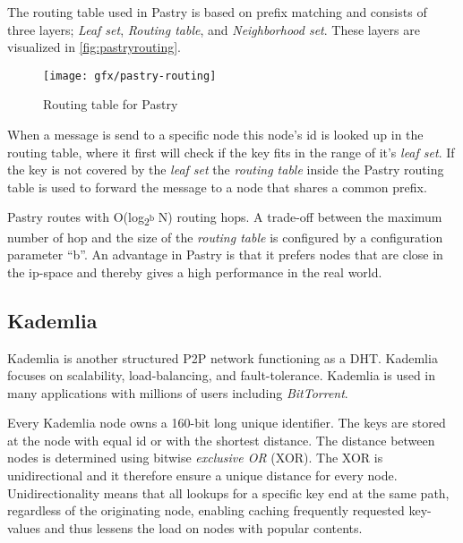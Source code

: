 The routing table used in Pastry is based on prefix matching and consists of three layers; \emph{Leaf set}, \emph{Routing table}, and \emph{Neighborhood set}. These layers are visualized in \autoref{fig:pastryrouting}.
\begin{figure}[bth]
\texttt{[image: gfx/pastry-routing]}
\caption[routingtable]{Routing table for Pastry} \label{fig:pastryrouting}
\end{figure}

When a message is send to a specific node this node's id is looked up in the routing table, where it first will check if the key fits in the range of it's \emph{leaf set}. If the key is not covered by the \emph{leaf set} the \emph{routing table} inside the Pastry routing table is used to forward the message to a node that shares a common prefix. 

Pastry routes with O(log\textsubscript{2\textsuperscript b} N) routing hops. A trade-off between the maximum number of hop and the size of the \emph{routing table} is configured by a configuration parameter ``b''.
An advantage in Pastry is that it prefers nodes that are close in the ip-space and thereby gives a high performance in the real world.



\subsection{Kademlia}
Kademlia is another structured P2P network functioning as a DHT. Kademlia focuses on scalability, load-balancing, and fault-tolerance. Kademlia is used in many applications with millions of users including \emph{BitTorrent}.

Every Kademlia node owns a 160-bit long unique identifier. The keys are stored at the node with equal id or with the shortest distance.
The distance between nodes is determined using bitwise \emph{exclusive OR} (XOR). The XOR is unidirectional and it therefore ensure a unique distance for every node. Unidirectionality means that all lookups for a specific key end at the same path, regardless of the originating node, enabling caching frequently requested key-values and thus lessens the load on nodes with popular contents.

